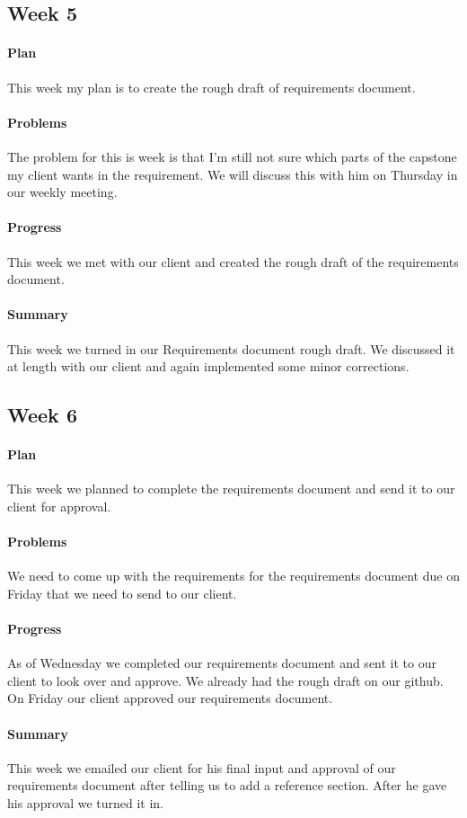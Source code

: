 \documentclass[onecolumn, draftclsnofoot,10pt, compsoc]{IEEEtran}
\begin{document}
\subsection{Week 5}
\paragraph{Plan}
This week my plan is to create the rough draft of requirements document.
\paragraph{Problems}
The problem for this is week is that I'm still not sure which parts of the capstone my client wants in the requirement. We will discuss this with him on Thursday in our weekly meeting.
\paragraph{Progress}
This week we met with our client and created the rough draft of the requirements document.
\paragraph{Summary}
This week we turned in our Requirements document rough draft. We discussed it at length with our client and again implemented some minor corrections.

\subsection{Week 6}
\paragraph{Plan}
This week we planned to complete the requirements document and send it to our client for approval.
\paragraph{Problems}
We need to come up with the requirements for the requirements document due on Friday that we need to send to our client.
\paragraph{Progress}
As of Wednesday we completed our requirements document and sent it to our client to look over and approve. We already had the rough draft on our github. On Friday our client approved our requirements document.
\paragraph{Summary}
This week we emailed our client for his final input and approval of our requirements document after telling us to add a reference section. After he gave his approval we turned it in.
\end{document}
